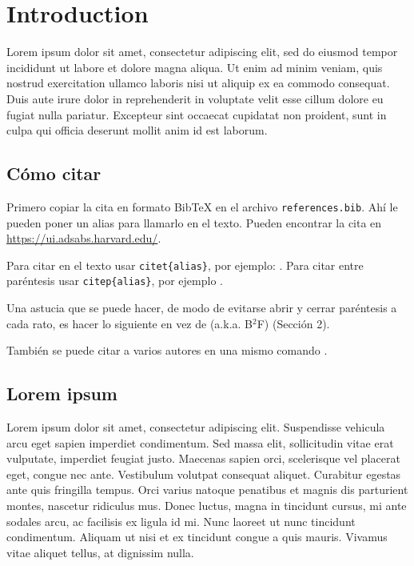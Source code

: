 
\chapter{Introduction} %
\label{Chapter1} %


Lorem ipsum dolor sit amet, consectetur adipiscing elit, sed do eiusmod tempor incididunt ut labore et dolore magna aliqua. Ut enim ad minim veniam, quis nostrud exercitation ullamco laboris nisi ut aliquip ex ea commodo consequat. Duis aute irure dolor in reprehenderit in voluptate velit esse cillum dolore eu fugiat nulla pariatur. Excepteur sint occaecat cupidatat non proident, sunt in culpa qui officia deserunt mollit anim id est laborum.

\section{Cómo citar}
Primero copiar la cita en formato BibTeX en el archivo \texttt{references.bib}. Ahí le pueden poner un alias para llamarlo en el texto. Pueden encontrar la cita en \url{https://ui.adsabs.harvard.edu/}.

Para citar en el texto usar \texttt{citet\{alias\}}, por ejemplo: \citet{B2FH}. Para citar entre paréntesis usar \texttt{citep\{alias\}}, por ejemplo \citep{B2FH}.

Una astucia que se puede hacer, de modo de evitarse abrir y cerrar paréntesis a cada rato, es hacer lo siguiente \citep[a.k.a. B$^2$F;][Sección 2]{B2FH} en vez de (a.k.a. B$^2$F) \citep{B2FH} (Sección 2).

También se puede citar a varios autores en una mismo comando \citep{Tregloan2020, B2FH}.



\section{Lorem ipsum}

Lorem ipsum dolor sit amet, consectetur adipiscing elit. Suspendisse vehicula arcu eget sapien imperdiet condimentum. Sed massa elit, sollicitudin vitae erat vulputate, imperdiet feugiat justo. Maecenas sapien orci, scelerisque vel placerat eget, congue nec ante. Vestibulum volutpat consequat aliquet. Curabitur egestas ante quis fringilla tempus. Orci varius natoque penatibus et magnis dis parturient montes, nascetur ridiculus mus. Donec luctus, magna in tincidunt cursus, mi ante sodales arcu, ac facilisis ex ligula id mi. Nunc laoreet ut nunc tincidunt condimentum. Aliquam ut nisi et ex tincidunt congue a quis mauris. Vivamus vitae aliquet tellus, at dignissim nulla.

